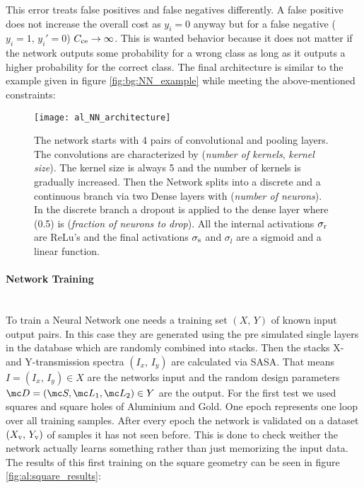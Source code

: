 \noindent
This error treats false positives and false negatives differently. A false positive does not increase the overall cost as $y_i = 0$ anyway but for a false negative ($y_i = 1, \, y_i' = 0$) $C_{\mathrm{ce}} \rightarrow \infty$. This is wanted behavior because it does not matter if the network outputs some probability for a wrong class as long as it outputs a higher probability for the correct class. The final architecture is similar to the example given in figure \ref{fig:bg:NN_example} while meeting the above-mentioned constraints:

\begin{figure}[H]
    \centering
    \texttt{[image: al\_NN\_architecture]}
    \caption{The network starts with 4 pairs of convolutional and pooling layers. The convolutions are characterized by (\textit{number of kernels}, \textit{kernel size}). The kernel size is always 5 and the number of kernels is gradually increased. Then the Network splits into a discrete and a continuous branch via two Dense layers with (\textit{number of neurons}). In the discrete branch a dropout is applied to the dense layer where (0.5) is (\textit{fraction of neurons to drop}).
    All the internal activations $\sigma_{\mathrm{r}}$ are ReLu's and the final activations $\sigma_{\mathrm{s}}$ and $\sigma_{l}$ are a sigmoid and a linear function.}
    \label{fig:al:NN_architecture}
\end{figure}

\newpage
\paragraph{Network Training}~\\
To train a Neural Network one needs a training set $(X, \, Y)$ of known input output pairs. In this case they are generated using the pre simulated single layers in the database which are randomly combined into stacks. Then the stacks X- and Y-transmission spectra $(I_x, \, I_y)$ are calculated via SASA.
That means $I = (I_x, \, I_y) \in X$ are the networks input and the random design parameters ${\mc D = (\mc S, \mc L_1, \mc L_2) \in Y}$ are the output. For the first test we used squares and square holes of Aluminium and Gold. One epoch represents one loop over all training samples. After every epoch the network is validated on a dataset $(X_{\mathrm{v}}, \, Y_{\mathrm{v}})$ of samples it has not seen before. This is done to check weither the network actually learns something rather than just memorizing the input data.  The results of this first training on the square geometry can be seen in figure \ref{fig:al:square_results}:

